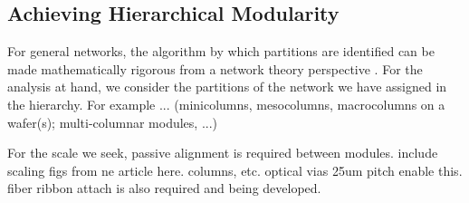 \subsection{Achieving Hierarchical Modularity}
For general networks, the algorithm by which partitions are identified can be made mathematically rigorous from a network theory perspective \cite{oz1992,oz2004}. For the analysis at hand, we consider the partitions of the network we have assigned in the hierarchy. For example ... (minicolumns, mesocolumns, macrocolumns on a wafer(s); multi-columnar modules, ...)

\vspace{3em}
For the scale we seek, passive alignment is required between modules. include scaling figs from ne article here. columns, etc. optical vias 25um pitch enable this. fiber ribbon attach is also required and being developed. 